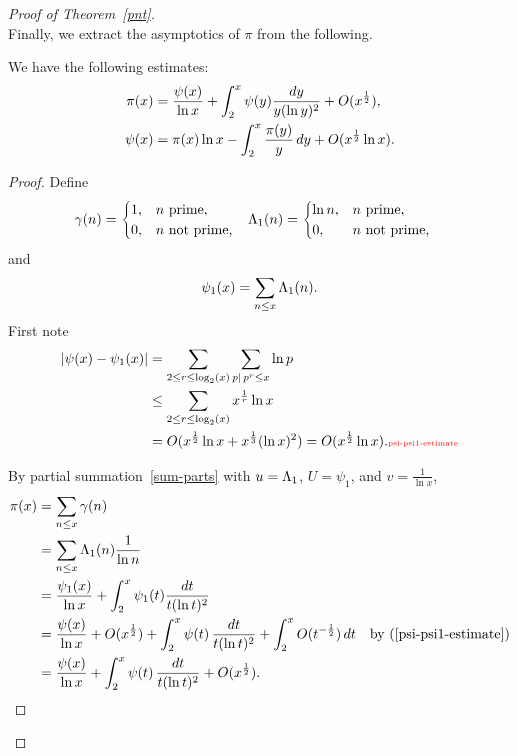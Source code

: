 \begin{proof}[Proof of Theorem~\ref{pnt}]
\begin{equation}
\end{equation}
Finally, we extract the asymptotics of $\pi$ from the following.
\begin{lem}
We have the following estimates:
\begin{align*}
\pi(x)&=\frac{\psi(x)}{\ln x}+\int_2^x \psi(y)\frac{dy}{y(\ln y)^2}+O(x^{\frac{1}{2}}),\\
\psi(x)&=\pi(x)\ln x-\int_2^x \frac{\pi(y)}{y}\,dy +O(x^{\frac{1}{2}}\ln x).
\end{align*}
\end{lem}
\begin{proof}
Define
\begin{align*}
\gamma(n)&=\begin{cases}
1,&n\text{ prime,}\\
0,&n\text{ not prime,}
\end{cases}&
\Lambda_1(n)&=\begin{cases}
\ln n,&n\text{ prime,}\\
0,&n\text{ not prime,}
\end{cases}
\end{align*}
and
\[
\psi_1(x)=\sum_{n\le x}\Lambda_1(n).
\]
First note
\begin{align}
\nonumber
|\psi(x)-\psi_1(x)|&=\sum_{2\le r\le \log_2(x)}\sum_{p\mid\,p^r\le x} \ln p\\
\nonumber
&\le \sum_{2\le r\le \log_2(x)} x^{\rc r}\ln x\\
&=O(x^{\rc 2}\ln x+x^{\rc 3}(\ln x)^2)=O(x^{\rc 2}\ln x).
\llabel{psi-psi1-estimate}
\end{align}

 By partial summation~\ref{sum-parts} with $u=\Lambda_1$, $U=\psi_1$, and $v=\frac{1}{\ln x}$,
\begin{align*}
\pi(x)&=\sum_{n\le x} \ga(n)\\
&=\sum_{n\le x}\La_1(n) \rc{\ln n}\\
&=\fc{\psi_1(x)}{\ln x} + \int_2^x\psi_1(t)\frac{dt}{t(\ln t)^2}\\
&=\fc{\psi(x)}{\ln x} +O(x^{\rc2}) +\int_2^x\psi(t)\,\fc{dt}{t(\ln t)^2}
+\int_2^x O(t^{-\rc2})\,dt&\by{psi-psi1-estimate}\\
&=\fc{\psi(x)}{\ln x}+\int_2^x\psi(t)\,\fc{dt}{t(\ln t)^2}+O(x^{\rc2}).
\end{align*}


\end{proof}
\end{proof}
